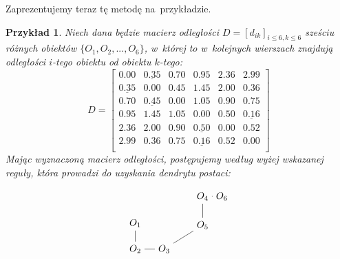 \documentclass[12pt,a4paper]{report}
\newtheorem{example}{Przykład}
\begin{document}
Zaprezentujemy teraz tę metodę na~przykładzie. 
\begin{example}Niech dana będzie macierz odległości $D=[d_{ik}]_{i\leq 6, k \leq 6}$ sześciu różnych obiektów $\{O_{1},O_{2},..., O_{6}\}$, w~której to w~kolejnych wierszach znajdują odległości $i$-tego obiektu od obiektu $k$-tego:
$$
D= \begin{bmatrix}
0.00 & \underline{0.35} & 0.70 & 0.95 & 2.36 & 2.99 \\
\underline{0.35} & 0.00 & 0.45 & 1.45 & 2.00 & 0.36 \\ 
0.70 & \underline{0.45} & 0.00 & 1.05 & 0.90 & 0.75 \\
0.95 & 1.45 & 1.05 & 0.00 & 0.50 & \underline{0.16} \\
2.36 & 2.00 & 0.90 & \underline{0.50} & 0.00 & 0.52 \\
2.99 & 0.36 & 0.75 & \underline{0.16} & 0.52 & 0.00  \\
\end{bmatrix}    
$$
Mając wyznaczoną macierz odległości, postępujemy według wyżej wskazanej reguły, która prowadzi do uzyskania dendrytu postaci:


$$
\begin{tikzpicture}[scale=.7]
  \node (1) at (0.0,0.1) {$O_{1}$};
  \node (2) at (0.0,-1.25) {$O_{2}$};
  \node (3) at (1.5,-1.25) {$O_{3}$};
 \node (4) at (3.5,1.5) {$O_{4}$};
 \node (5) at (3.5,0.00) {$O_{5}$};
 \node (6) at (4.5,1.5) {$O_{6}$};
 
   \draw (1)--(2)--(3)--(5)--(4)--(6); 
\end{tikzpicture}
$$ 
\end{example}
\end{document}
